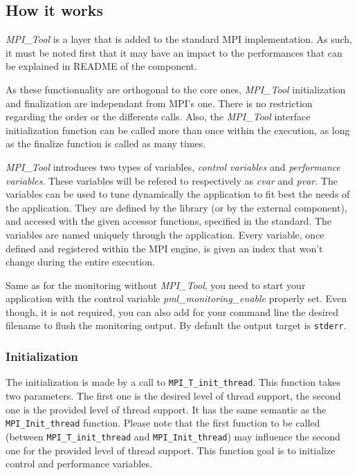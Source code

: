 \documentclass[notitlepage]{article}
\newcommand{\mpit}[1]{\textit{MPI\_Tool#1}}
\begin{document}
\subsection{How it works}

\mpit{} is a layer that is added to the standard MPI
implementation. As such, it must be noted first that it may have an
impact to the performances that can be explained in README of the
component.

As these functionnality are orthogonal to the core ones, \mpit{}
initialization and finalization are independant from MPI's one. There
is no restriction regarding the order or the differents calls. Also,
the \mpit{} interface initialization function can be called more than
once within the execution, as long as the finalize function is called
as many times.

\mpit{} introduces two types of variables, \textit{control variables}
and \textit{performance variables}. These variables will be refered to
respectively as \textit{cvar} and \textit{pvar}. The variables can be
used to tune dynamically the application to fit best the needs of the
application. They are defined by the library (or by the external
component), and accesed with the given accessor functions, specified
in the standard. The variables are named uniquely through the
application. Every variable, once defined and registered within the
MPI engine, is given an index that won't change during the entire
execution.

Same as for the monitoring without \mpit{}, you need to start your
application with the control variable \textit{pml\_monitoring\_enable}
properly set. Even though, it is not required, you can also add for
your command line the desired filename to flush the monitoring
output. By default the output target is \texttt{stderr}.

\subsubsection{Initialization}

The initialization is made by a call to
\texttt{MPI\_T\_init\_thread}. This function takes two parameters. The
first one is the desired level of thread support, the second one is
the provided level of thread support. It has the same semantic as the
\texttt{MPI\_Init\_thread} function. Please note that the first
function to be called (between \texttt{MPI\_T\_init\_thread} and
\texttt{MPI\_Init\_thread}) may influence the second one for the
provided level of thread support. This function goal is to initialize
control and performance variables.
\end{document}
